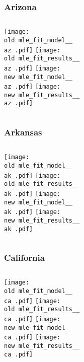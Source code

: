 \documentclass{beamer}
\newcommand{\old}{api-370-prod/pyseir/state_summaries/reports/}
\newcommand{\new}{new/pyseir/state_summaries/reports/}
\newcommand{\az}{Arizona__04}
\newcommand{\ak}{Arkansas__05}
\newcommand{\ca}{California__06}
\begin{document}
\begin{frame}
\frametitle{Arizona}
    \begin{columns}[t]

       \texttt{[image: \\old mle\_fit\_model\_\_\\az .pdf]}
       \texttt{[image: \\old mle\_fit\_results\_\_\\az .pdf]}   
       \texttt{[image: \\new mle\_fit\_model\_\_\\az .pdf]}
       \texttt{[image: \\new mle\_fit\_results\_\_\\az .pdf]}   
       
\end{columns}
\end{frame}

\begin{frame}
\frametitle{Arkansas}
    \begin{columns}[t]

       \texttt{[image: \\old mle\_fit\_model\_\_\\ak .pdf]}
       \texttt{[image: \\old mle\_fit\_results\_\_\\ak .pdf]}   
       \texttt{[image: \\new mle\_fit\_model\_\_\\ak .pdf]}
       \texttt{[image: \\new mle\_fit\_results\_\_\\ak .pdf]}   
       
\end{columns}
\end{frame}

\begin{frame}
\frametitle{California}
    \begin{columns}[t]

       \texttt{[image: \\old mle\_fit\_model\_\_\\ca .pdf]}
       \texttt{[image: \\old mle\_fit\_results\_\_\\ca .pdf]}   
       \texttt{[image: \\new mle\_fit\_model\_\_\\ca .pdf]}
       \texttt{[image: \\new mle\_fit\_results\_\_\\ca .pdf]}   
       
\end{columns}
\end{frame}
\end{document}
